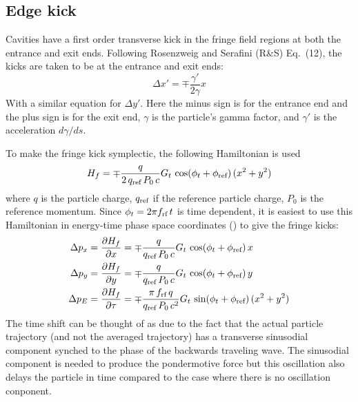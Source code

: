 \subsection{Edge kick}

Cavities have a first order transverse kick in the fringe field regions at both the entrance and
exit ends. Following Rosenzweig and Serafini\cite{b:rosenzweig} (R\&S) Eq.~(12), the kicks are taken
to be at the entrance and exit ends:
\begin{equation}
  \Delta x' = \mp \frac{\gamma'}{2 \gamma} x
\end{equation}
With a similar equation for $\Delta y'$. Here the minus sign is for the entrance end and the plus
sign is for the exit end, $\gamma$ is the particle's gamma factor, and $\gamma'$ is the acceleration
$d\gamma/ds$.

To make the fringe kick symplectic, the following Hamiltonian is used
\begin{equation}
  H_f = \mp \frac{q}{2 \, q_{\text{ref}} \, P_0 \, c} G_t \, \cos(\phi_t + \phi_{\text{ref}}) \, (x^2 + y^2)
\end{equation}
where $q$ is the particle charge, $q_{\text{ref}}$ if the reference particle charge, $P_0$ is the
reference momentum.  Since $\phi_t = 2 \pi f_{\text{rf}} \, t$ is time dependent, it is easiest to use
this Hamiltonian in energy-time phase space coordinates () to give the
fringe kicks:
\begin{align}
  \Delta p_x &= \frac{\partial H_f}{\partial x} 
              = \mp \frac{q}{q_{\text{ref}} \, P_0 \, c} G_t \, \cos(\phi_t + \phi_{\text{ref}}) \, x \nonumber \\
  \Delta p_y &= \frac{\partial H_f}{\partial y} 
              = \mp\frac{q}{q_{\text{ref}} \, P_0 \, c} G_t \, \cos(\phi_t + \phi_{\text{ref}}) \, y \\
  \Delta p_E &= \frac{\partial H_f}{\partial \tau} 
                 = \mp \frac{\pi \, f_{\text{rf}} \, q}{q_{\text{ref}} \, P_0 \, c^2} G_t \, \sin(\phi_t + \phi_{\text{ref}}) \, (x^2 + y^2)
      \nonumber
\end{align}
The time shift can be thought of as due to the fact that the actual particle trajectory (and not the
averaged trajectory) has a transverse sinusodial component synched to the phase of the backwards
traveling wave.  The sinusodial component is needed to produce the pondermotive force but this
oscillation also delays the particle in time compared to the case where there is no oscillation
conponent.

